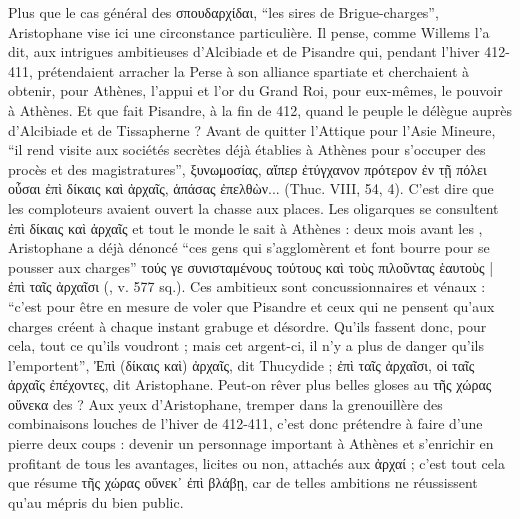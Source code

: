{Plus que le cas général des σπουδαρχίδαι, “les sires de Brigue-charges”, Aristophane vise ici une circonstance particulière. Il pense, comme Willems l'a dit, aux intrigues ambitieuses d'Alcibiade et de Pisandre qui, pendant l'hiver 412-411, prétendaient arracher la Perse à son alliance spartiate et cherchaient à obtenir, pour Athènes, l'appui et l'or du Grand Roi, pour eux-mêmes, le pouvoir à Athènes. Et que fait Pisandre, à la fin de 412, quand le peuple le délègue auprès d'Alcibiade et de Tissapherne ? Avant de quitter l'Attique pour l'Asie Mineure, “il rend visite aux sociétés secrètes déjà établies à Athènes pour s'occuper des procès et des magistratures”, ξυνωμοσίας, αἵπερ ἐτύγχανον πρότερον ἐν τῇ πόλει οὖσαι ἐπὶ δίκαις καὶ ἀρχαῖς, ἁπάσας ἐπελθὼν... (Thuc. VIII, 54, 4). C'est dire que les comploteurs avaient ouvert la chasse aux places. Les oligarques se consultent ἐπὶ δίκαις καὶ ἀρχαῖς et tout le monde le sait à Athènes : deux mois avant les , Aristophane a déjà dénoncé “ces gens qui s'agglomèrent et font bourre pour se pousser aux charges” τούς γε συνισταμένους τούτους καὶ τοὺς πιλοῦντας ἑαυτοὺς | ἐπὶ ταῖς ἀρχαῖσι (, v. 577 sq.). Ces ambitieux sont concussionnaires et vénaux : “c'est pour être en mesure de voler que Pisandre et ceux qui ne pensent qu'aux charges créent à chaque instant grabuge et désordre. Qu'ils fassent donc, pour cela, tout ce qu'ils voudront ; mais cet argent-ci, il n'y a plus de danger qu'ils l'emportent”, 
Ἐπὶ (δίκαις καὶ) ἀρχαῖς, dit Thucydide ; ἐπὶ ταῖς ἀρχαῖσι, οἱ ταῖς ἀρχαῖς ἐπέχοντες, dit Aristophane. Peut-on rêver plus belles gloses au τῆς χώρας οὕνεκα des  ? Aux yeux d'Aristophane, tremper dans la grenouillère des combinaisons louches de l'hiver de 412-411, c'est donc prétendre à faire d'une pierre deux coups : devenir un personnage important à Athènes et s'enrichir en profitant de tous les avantages, licites ou non, attachés aux ἀρχαί ; c'est tout cela que résume τῆς χώρας οὕνεκ᾽ ἐπὶ βλάβῃ, car de telles ambitions ne réussissent qu'au mépris du bien public.}
